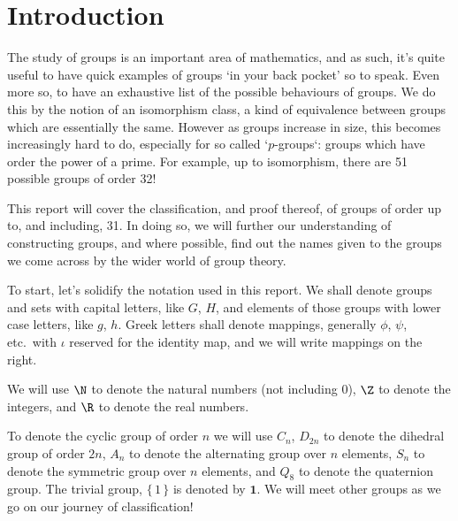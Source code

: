 \section{Introduction}
The study of groups is an important area of mathematics, and as such, it's quite useful to have quick examples of groups
`in your back pocket' so to speak.
Even more so, to have an exhaustive list of the possible behaviours of groups.
We do this by the notion of an isomorphism class, a kind of equivalence between groups which are essentially the same.
However as groups increase in size, this becomes increasingly hard to do, especially for so called `\(p\)-groups`:
groups which have order the power of a prime.
For example, up to isomorphism, there are 51 possible groups of order 32!

This report will cover the classification, and proof thereof, of groups of order up to, and including, 31.
In doing so, we will further our understanding of constructing groups, and where possible, find out the names given to
the groups we come across by the wider world of group theory.

To start, let's solidify the notation used in this report.
We shall denote groups and sets with capital letters, like \(G\), \(H\), and elements of those groups with lower case
letters, like \(g\), \(h\).
Greek letters shall denote mappings, generally \(\phi\), \(\psi\), etc.\ with \(\iota\) reserved for the identity map,
and we will write mappings on the right.

We will use \(\N\) to denote the natural numbers (not including 0), \(\Z\) to denote the integers, and \(\R\) to denote
the real numbers.

To denote the cyclic group of order \(n\) we will use \(C_n\), \(D_{2n}\) to denote the dihedral group of order \(2n\),
\(A_n\) to denote the alternating group over \(n\) elements, \(S_n\) to denote the symmetric group over \(n\)
elements, and \(Q_8\) to denote the quaternion group.
The trivial group, \(\{\, 1\, \}\) is denoted by \(\bm{1}\).
We will meet other groups as we go on our journey of classification!

